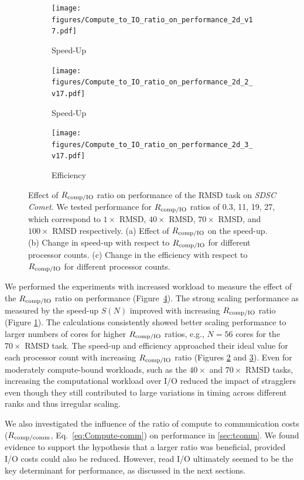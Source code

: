 \begin{figure}[!htb]
  \centering
  \begin{subfigure} {.3\textwidth}
    \texttt{[image: figures/Compute\_to\_IO\_ratio\_on\_performance\_2d\_v17.pdf]}
    \caption{Speed-Up}
    \label{fig:S1_tcomp_tIO_effect}
  \end{subfigure}
  \hfill
  \begin{subfigure}{.3\textwidth}
    \texttt{[image: figures/Compute\_to\_IO\_ratio\_on\_performance\_2d\_2\_v17.pdf]}
    \caption{Speed-Up}
    \label{fig:S2_tcomp_tIO_effect}
  \end{subfigure}
  \hfill
  \begin{subfigure}{.3\textwidth}
    \texttt{[image: figures/Compute\_to\_IO\_ratio\_on\_performance\_2d\_3\_v17.pdf]}
    \caption{Efficiency}
    \label{fig:E_tcomp_tIO_effect}
  \end{subfigure}
  \caption{Effect of $R_{\text{comp/IO}}$ ratio on performance of the RMSD task on \emph{SDSC Comet}. We tested performance for $R_{\text{comp/IO}}$ ratios of 0.3, 11, 19, 27, which correspond to $1\times$ RMSD, $40\times$ RMSD, $70\times$ RMSD, and $100\times$ RMSD respectively.
    (a) Effect of $R_{\text{comp/IO}}$ on the speed-up.
    (b) Change in speed-up with respect to $R_{\text{comp/IO}}$ for different processor counts.
    (c) Change in the efficiency with respect to $R_{\text{comp/IO}}$ for different processor counts.}
  \label{fig:tcomp_tIO_effect}
\end{figure}

We performed the experiments with increased workload to measure the effect of the $R_{\text{comp/IO}}$ ratio on performance (Figure~\ref{fig:tcomp_tIO_effect}).
The strong scaling performance as measured by the speed-up $S(N)$ improved with increasing $R_{\text{comp/IO}}$ ratio (Figure \ref{fig:S1_tcomp_tIO_effect}).
The calculations consistently showed better scaling performance to larger numbers of cores for higher $R_{\text{comp/IO}}$ ratios, e.g., $N=56$ cores for the $70\times$ RMSD task. 
The speed-up and efficiency approached their ideal value for each processor count with increasing $R_{\text{comp/IO}}$ ratio (Figures \ref{fig:S2_tcomp_tIO_effect} and \ref{fig:E_tcomp_tIO_effect}).
Even for moderately compute-bound workloads, such as the $40\times$ and $70\times$ RMSD tasks, increasing the computational workload over I/O reduced the impact of stragglers even though they still contributed to large variations in timing across different ranks and thus irregular scaling.

We also investigated the influence of the ratio of compute to communication costs ($R_{\text{comp/comm}}$, Eq.~\ref{eq:Compute-comm}) on performance in \ref{sec:tcomm}.
We found evidence to support the hypothesis that a larger ratio was beneficial, provided I/O costs could also be reduced.
However, read I/O ultimately seemed to be the key determinant for performance, as discussed in the next sections.


